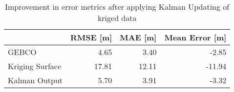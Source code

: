 \begin{table}
\centering
\caption{Improvement in error metrics after applying Kalman Updating of kriged data}
\label{tab:oahu7_gebco_raster_error}
\begin{tabular}{lrrr}
\toprule
 & RMSE [m] & MAE [m] & Mean Error [m] \\
\midrule
GEBCO & 4.65 & 3.40 & -2.85 \\
Kriging Surface & 17.81 & 12.11 & -11.94 \\
Kalman Output & 5.70 & 3.91 & -3.32 \\
\bottomrule
\end{tabular}
\end{table}
